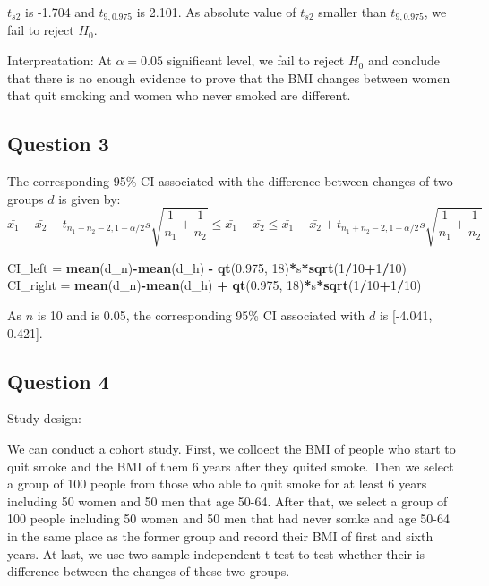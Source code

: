 \documentclass[]{article}
\newenvironment{Shaded}{\begin{snugshade}}{\end{snugshade}}
\newcommand{\KeywordTok}[1]{\textcolor[rgb]{0.13,0.29,0.53}{\textbf{#1}}}
\newcommand{\DecValTok}[1]{\textcolor[rgb]{0.00,0.00,0.81}{#1}}
\newcommand{\FloatTok}[1]{\textcolor[rgb]{0.00,0.00,0.81}{#1}}
\newcommand{\StringTok}[1]{\textcolor[rgb]{0.31,0.60,0.02}{#1}}
\newcommand{\OperatorTok}[1]{\textcolor[rgb]{0.81,0.36,0.00}{\textbf{#1}}}
\newcommand{\NormalTok}[1]{#1}
\begin{document}
\(t_{s2}\) is -1.704 and \(t_{9,0.975}\) is 2.101. As absolute value of
\(t_{s2}\) smaller than \(t_{9,0.975}\), we fail to reject \(H_0\).

Interpreatation: At \(\alpha = 0.05\) significant level, we fail to
reject \(H_0\) and conclude that there is no enough evidence to prove
that the BMI changes between women that quit smoking and women who never
smoked are different.

\subsection{Question 3}\label{question-3}

The corresponding 95\% CI associated with the difference between changes
of two groups \(d\) is given by:
\[ \bar{x_1}-\bar{x_2}-t_{n_1+n_2-2,1-\alpha/2}s\sqrt{\frac{1}{n_1}+\frac{1}{n_2}} \leq \bar{x_1}-\bar{x_2} \leq \bar{x_1}-\bar{x_2}+t_{n_1+n_2-2,1-\alpha/2}s\sqrt{\frac{1}{n_1}+\frac{1}{n_2}} \]

\begin{Shaded}
\begin{Highlighting}[]
\NormalTok{CI_left =}\StringTok{ }\KeywordTok{mean}\NormalTok{(d_n)}\OperatorTok{-}\KeywordTok{mean}\NormalTok{(d_h) }\OperatorTok{-}\StringTok{ }\KeywordTok{qt}\NormalTok{(}\FloatTok{0.975}\NormalTok{, }\DecValTok{18}\NormalTok{)}\OperatorTok{*}\NormalTok{s}\OperatorTok{*}\KeywordTok{sqrt}\NormalTok{(}\DecValTok{1}\OperatorTok{/}\DecValTok{10}\OperatorTok{+}\DecValTok{1}\OperatorTok{/}\DecValTok{10}\NormalTok{)}
\NormalTok{CI_right =}\StringTok{ }\KeywordTok{mean}\NormalTok{(d_n)}\OperatorTok{-}\KeywordTok{mean}\NormalTok{(d_h) }\OperatorTok{+}\StringTok{ }\KeywordTok{qt}\NormalTok{(}\FloatTok{0.975}\NormalTok{, }\DecValTok{18}\NormalTok{)}\OperatorTok{*}\NormalTok{s}\OperatorTok{*}\KeywordTok{sqrt}\NormalTok{(}\DecValTok{1}\OperatorTok{/}\DecValTok{10}\OperatorTok{+}\DecValTok{1}\OperatorTok{/}\DecValTok{10}\NormalTok{)}
\end{Highlighting}
\end{Shaded}

As \(n\) is 10 and \alpha is 0.05, the corresponding 95\% CI associated
with \(d\) is {[}-4.041, 0.421{]}.

\subsection{Question 4}\label{question-4}

Study design:

We can conduct a cohort study. First, we colloect the BMI of people who
start to quit smoke and the BMI of them 6 years after they quited smoke.
Then we select a group of 100 people from those who able to quit smoke
for at least 6 years including 50 women and 50 men that age 50-64. After
that, we select a group of 100 people including 50 women and 50 men that
had never somke and age 50-64 in the same place as the former group and
record their BMI of first and sixth years. At last, we use two sample
independent t test to test whether their is difference between the
changes of these two groups.
\end{document}

